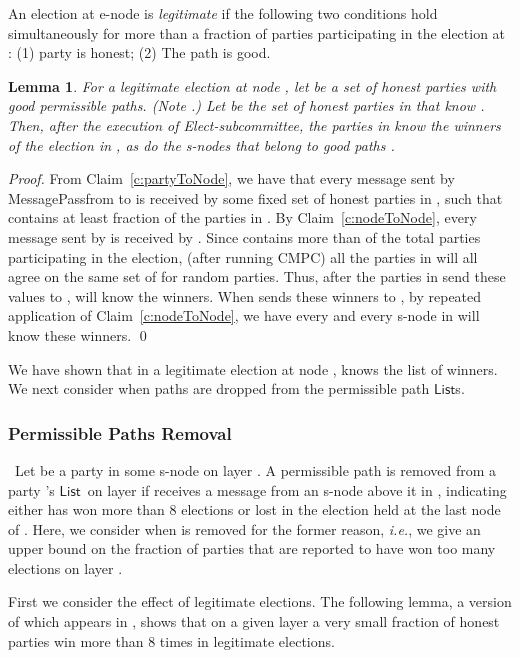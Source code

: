\documentclass[11pt,letter]{article}
\newcommand{\ie}{\emph{i.e.}}
\theoremstyle{mytheoremstyle}
\newtheorem{lemma}{Lemma}
\newcommand{\hw}{\mbox{\textsf{CMPC}}\xspace}
\newcommand{\MessagePass}{\textsf{MessagePass}}
\newcommand{\lst}{\ensuremath{\mathsf{List}}}
\begin{document}
\begin{description}
{An election at \textsf{e-node}  is {\em legitimate} if the following two conditions hold simultaneously for more than a  fraction of parties  participating in the election at : (1) party  is honest; (2) The path  is good.

\begin{lemma}
	\label{l:legitimateElections}
	For a legitimate election at node , let  be a set of honest parties with good permissible paths. (Note .) Let  be the set of honest parties in  that know . Then, after the execution of {\sc Elect-subcommittee}, the parties in  know the winners of the election in , as do the \textsf{s-node}s that belong to good paths .
\end{lemma}
\begin{proof}
	From Claim~\ref{c:partyToNode}, we have that every message  sent by \MessagePass from  to  is received by some fixed set  of honest parties in , such that  contains at least  fraction of the parties in .
	By Claim~\ref{c:nodeToNode}, every message sent by  is received by . Since  contains more than  of the total parties participating in the election, (after running \hw) all the parties in  will all agree on the same set of for random parties. Thus, after the parties in  send these values to ,  will know the winners. When  sends these winners to , by repeated application of Claim~\ref{c:nodeToNode}, we have every  and every \textsf{s-node} in  will know these winners.
	\qed
\end{proof}

We have shown that in a legitimate election at node ,  knows the list of winners. We next consider when paths are dropped from the permissible path \lst s.

\subsubsection{Permissible Paths Removal}
\ Let  be a party in some \textsf{s-node} on layer . A permissible path  is removed from a party 's \lst\ on layer  if  receives a message from an \textsf{s-node} above it in , indicating either  has won more than 8 elections or  lost in the election held at the last node of . Here, we consider when  is removed for the former reason, \ie, we give an upper bound on the fraction of parties that are reported to have won too many elections on layer .

First we consider the effect of legitimate elections. The following lemma, a version of which appears in \cite{KSSV,King:2006:TSS:1170136.1170491}, shows that on a given layer a very small fraction of honest parties win more than 8 times in legitimate elections.

}
\end{description}
\end{document}
